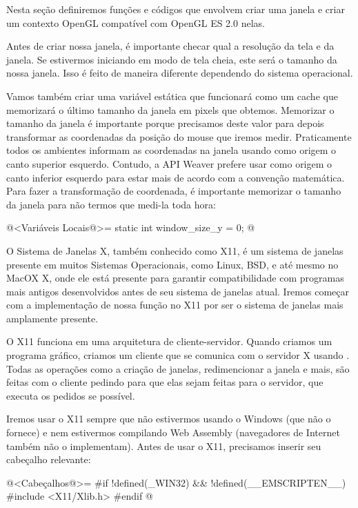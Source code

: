Nesta seção definiremos funções e códigos que envolvem criar uma
janela e criar um contexto OpenGL compatível com OpenGL ES 2.0 nelas.


Antes de criar nossa janela, é importante checar qual a resolução da
tela e da janela. Se estivermos iniciando em modo de tela cheia, este
será o tamanho da nossa janela. Isso é feito de maneira diferente
dependendo do sistema operacional.

Vamos também criar uma variável estática que funcionará como um cache
que memorizará o último tamanho da janela em pixels que
obtemos. Memorizar o tamanho da janela é importante porque precisamos
deste valor para depois transformar as coordenadas da posição do mouse
que iremos medir. Praticamente todos os ambientes informam as
coordenadas na janela usando como origem o canto superior
esquerdo. Contudo, a API Weaver prefere usar como origem o canto
inferior esquerdo para estar mais de acordo com a convenção
matemática. Para fazer a transformação de coordenada, é importante
memorizar o tamanho da janela para não termos que medi-la toda hora:

\iniciocodigo
@<Variáveis Locais@>=
static int window_size_y = 0;
@
\fimcodigo


O Sistema de Janelas X, também conhecido como X11, é um sistema de
janelas presente em muitos Sistemas Operacionais, como Linux, BSD, e
até mesmo no MacOX X, onde ele está presente para garantir
compatibilidade com programas mais antigos desenvolvidos antes de seu
sistema de janelas atual. Iremos começar com a implementação de nossa
função no X11 por ser o sistema de janelas mais amplamente presente.

O X11 funciona em uma arquitetura de cliente-servidor. Quando criamos
um programa gráfico, criamos um cliente que se comunica com o servidor
X usando . Todas as operações como a criação de
janelas, redimencionar a janela e mais, são feitas com o cliente
pedindo para que elas sejam feitas para o servidor, que executa os
pedidos se possível.

Iremos usar o X11 sempre que não estivermos usando o Windows (que não
o fornece) e nem estivermos compilando Web Assembly (navegadores de
Internet também não o implementam). Antes de usar o X11, precisamos
inserir seu cabeçalho relevante:

\iniciocodigo
@<Cabeçalhos@>=
#if !defined(_WIN32) && !defined(__EMSCRIPTEN__)
#include <X11/Xlib.h>
#endif
@
\fimcodigo

